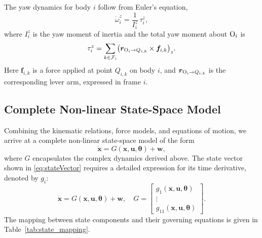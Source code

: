 \documentclass[conference]{IEEEtran}
\begin{document}
The yaw dynamics for body $i$ follow from Euler's equation,
\begin{equation}
    \dot{\omega}^z_i = \frac{1}{I^z_i}\,\tau^z_i, \label{eq:Euler}
\end{equation}
where $I^z_i$ is the yaw moment of inertia and the total yaw moment about $\text{O}_i$ is
\begin{equation}
    \tau^z_i = \sum_{k \in \mathcal{F}_i} \bigl(\bm r_{\text{O}_i\to Q_{i,k}} \times \bm f_{i,k}\bigr)_z .
\end{equation}
Here $\bm f_{i,k}$ is a force applied at point $Q_{i,k}$ on body $i$, and $\bm r_{\text{O}_i\to Q_{i,k}}$ is the corresponding lever arm, expressed in frame $i$.


\subsection{Complete Non-linear State-Space Model}
Combining the kinematic relations, force models, and equations of motion, we arrive at a complete non-linear state-space model of the form
\begin{equation}
    \dot{\bm x} = G(\bm x, \bm u, \bm\theta) + \bm w,
\end{equation}
where $G$ encapsulates the complex dynamics derived above. The state vector shown in \ref{eq:stateVector} requires a detailed expression for its time derivative, denoted by $g_i$:
\begin{equation}
    \dot{\bm x} = G(\bm x,\bm u,\bm\theta)+\bm w,\quad G=\begin{bmatrix}g_1(\bm x,\bm u,\bm\theta)\\ \vdots \\ g_{11}(\bm x,\bm u,\bm\theta)\end{bmatrix}.
\end{equation}
The mapping between state components and their governing equations is given in Table~\ref{tab:state_mapping}.
\end{document}
